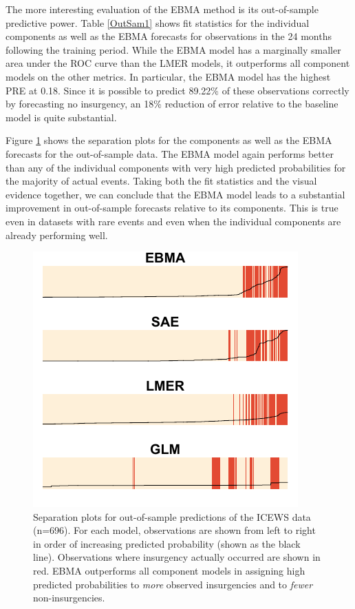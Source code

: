 The more interesting evaluation of the EBMA method is its
out-of-sample predictive power. Table \ref{OutSam1} shows fit
statistics for the individual components as well as the EBMA forecasts
for observations in the 24 months following the training period.
While the EBMA model has a marginally smaller area under the ROC curve
than the LMER models, it outperforms all component models on the other
metrics. In particular, the EBMA model has the highest PRE at 0.18.
Since it is possible to predict 89.22\% of these observations
correctly by forecasting no insurgency, an 18\% reduction of error
relative to the baseline model is quite substantial.

Figure \ref{OutSam1sep} shows the separation plots for the components
as well as the EBMA forecasts for the out-of-sample data.  The EBMA
model again performs better than any of the individual components with
very high predicted probabilities for the majority of actual events.
Taking both the fit statistics and the visual evidence together, we
can conclude that the EBMA model leads to a substantial improvement in
out-of-sample forecasts relative to its components.  This is true even
in datasets with rare events and even when the individual components
are already performing well.


\begin{figure}
  \caption{\footnotesize Separation plots for out-of-sample
    predictions of the ICEWS data (n=696).  For each model,
    observations are shown from left to right in order of increasing
    predicted probability (shown as the black line).  Observations
    where insurgency actually occurred are shown in red.  EBMA
    outperforms all component models in assigning high predicted
    probabilities to \textit{more} observed insurgencies and to
    \textit{fewer} non-insurgencies.}
\label{OutSam1sep}
\begin{center}
\includegraphics[]{OutSampleNew.pdf}
\end{center}
\end{figure}


